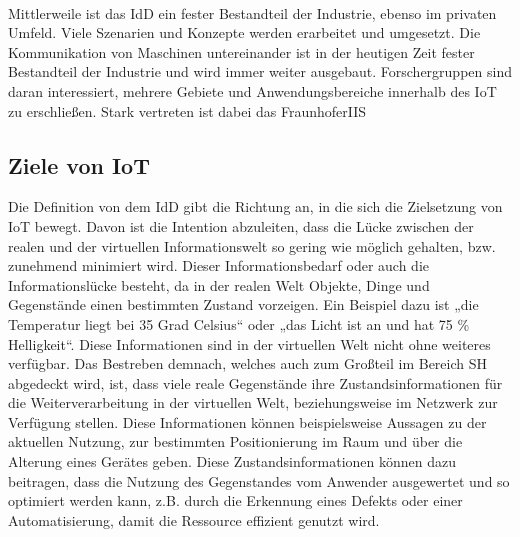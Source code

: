         \\
        \pagebreak
        \linebreak
        Mittlerweile ist das \acl{IdD} ein fester Bestandteil der Industrie, ebenso im privaten Umfeld. Viele 
        Szenarien und Konzepte werden erarbeitet und umgesetzt. Die Kommunikation von Maschinen untereinander 
        ist in der heutigen Zeit fester Bestandteil der Industrie und wird immer weiter ausgebaut. Forschergruppen sind daran interessiert, mehrere 
        Gebiete und Anwendungsbereiche innerhalb des \acs{IoT} zu erschließen. Stark vertreten ist dabei das \ac{FraunhoferIIS}

    \subsection{Ziele von \acs{IoT}}
    \label{subsec:ziele-iot}
        Die Definition von dem \acl{IdD} gibt die Richtung an, in die sich die Zielsetzung von 
        \acs{IoT} bewegt. Davon ist die Intention abzuleiten, dass die Lücke zwischen der realen und der 
        virtuellen Informationswelt so gering wie möglich gehalten, bzw. zunehmend minimiert wird. 
        Dieser Informationsbedarf oder auch die Informationslücke besteht, da in der realen Welt Objekte, 
        Dinge und Gegenstände einen bestimmten Zustand vorzeigen. Ein Beispiel dazu ist „die Temperatur liegt bei 35 Grad Celsius“ 
        oder „das Licht ist an und hat 75 \% Helligkeit“. Diese Informationen sind in der virtuellen Welt nicht 
        ohne weiteres verfügbar. 
        Das Bestreben demnach, welches auch zum Großteil im Bereich \acl{SH} abgedeckt wird, ist, dass 
        viele reale Gegenstände ihre Zustandsinformationen für die Weiterverarbeitung in der virtuellen 
        Welt, beziehungsweise im Netzwerk zur Verfügung stellen. Diese Informationen können beispielsweise 
        Aussagen zu der aktuellen Nutzung, zur bestimmten Positionierung im Raum und 
        über die Alterung eines Gerätes geben. Diese Zustandsinformationen können dazu beitragen, dass die Nutzung des 
        Gegenstandes vom Anwender ausgewertet und so optimiert werden kann, z.B. durch die Erkennung 
        eines Defekts oder einer Automatisierung, damit die Ressource effizient genutzt wird. 


